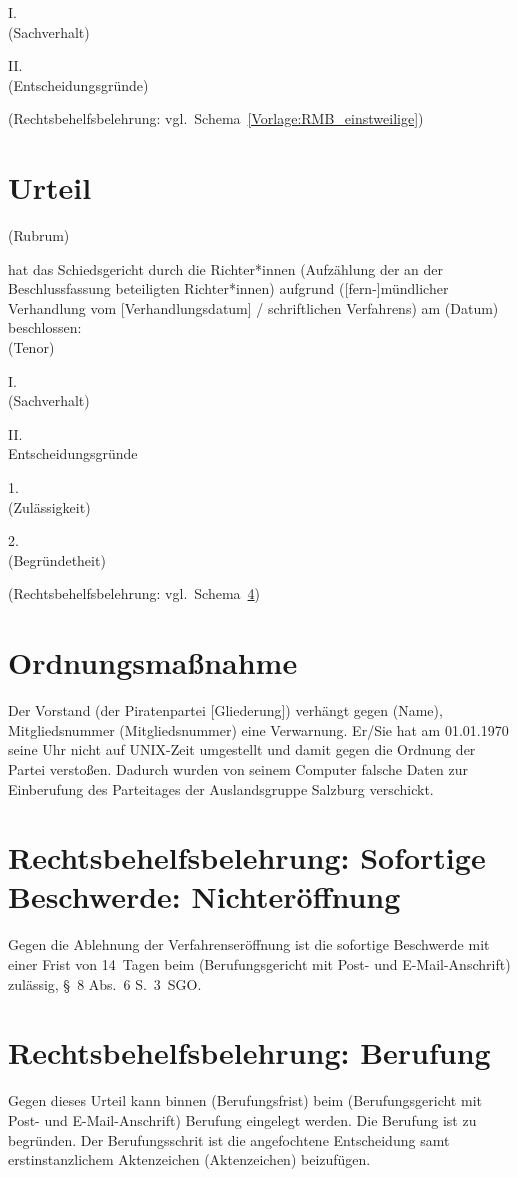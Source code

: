 I.\\
(Sachverhalt)

II.\\
(Entscheidungsgründe)

(Rechtsbehelfsbelehrung: vgl.~Schema~\ref{Vorlage:RMB_einstweilige})

\section{Urteil}
\label{Vorlage:Urteil}
(Rubrum)

hat das Schiedsgericht durch die Richter*innen (Aufzählung der an der Beschlussfassung beteiligten Richter*innen) aufgrund ([fern-]mündlicher Verhandlung vom [Verhandlungsdatum] / schriftlichen Verfahrens) am (Datum) beschlossen:\\
(Tenor)

I.\\
(Sachverhalt)

II.\\
Entscheidungsgründe

1.\\
(Zulässigkeit)

2.\\
(Begründetheit)

(Rechtsbehelfsbelehrung: vgl.~Schema~\ref{Vorlage:RMB_Berufung})

\section{Ordnungsmaßnahme}
\label{Vorlage:OM}
Der Vorstand (der Piratenpartei [Gliederung]) verhängt gegen (Name), Mitgliedsnummer (Mitgliedsnummer) eine Verwarnung.
Er/Sie hat am 01.01.1970 seine Uhr nicht auf UNIX-Zeit umgestellt und damit gegen die Ordnung der Partei verstoßen.
Dadurch wurden von seinem Computer falsche Daten zur Einberufung des Parteitages der Auslandsgruppe Salzburg verschickt.

\section{Rechtsbehelfsbelehrung: Sofortige Beschwerde: Nichteröffnung}
\label{Vorlage:RMB_Eröffnungsbeschwerde}
Gegen die Ablehnung der Verfahrenseröffnung ist die sofortige Beschwerde mit einer Frist von 14~Tagen beim (Berufungsgericht mit Post- und E-Mail-Anschrift) zulässig, \S~8 Abs.~6 S.~3~SGO.

\section{Rechtsbehelfsbelehrung: Berufung}
\label{Vorlage:RMB_Berufung}
Gegen dieses Urteil kann binnen (Berufungsfrist) beim (Berufungsgericht mit Post- und E-Mail-Anschrift) Berufung eingelegt werden.
Die Berufung ist zu begründen.
Der Berufungsschrit ist die angefochtene Entscheidung samt erstinstanzlichem Aktenzeichen (Aktenzeichen) beizufügen.


